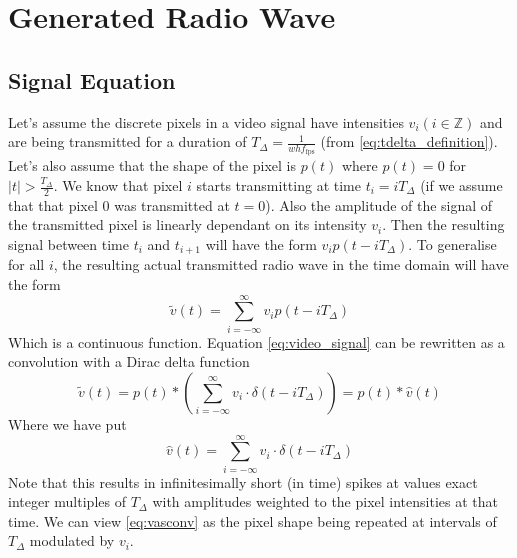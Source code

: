 \documentclass[a4paper,12pt,twoside,openright]{report}
\begin{document}
\section{Generated Radio Wave}

\subsection{Signal Equation}
Let's assume the discrete pixels in a video signal have intensities $v_{i} (i \in \mathbb{Z})$ and are being transmitted for a duration of $T_{\Delta}=\frac{1}{w h f_\text{fps}}$ (from \ref{eq:tdelta_definition}). Let's also assume that the shape of the pixel is $p(t)$ where $p(t)=0$ for $|t| > \frac{T_{\Delta}}{2}$. We know that pixel $i$ starts transmitting at time $t_{i}=i T_{\Delta}$ (if we assume that that pixel 0 was transmitted at $t=0$). Also the amplitude of the signal of the transmitted pixel is linearly dependant on its intensity $v_{i}$. Then the resulting signal between time $t_{i}$ and $t_{i+1}$ will have the form $v_{i} p(t-i T_{\Delta})$. To generalise for all $i$, the resulting actual transmitted radio wave in the time domain will have the form 
\begin{equation}
\label{eq:video_signal}
\tilde{v}(t) = \sum\limits_{i=-\infty}^{\infty} v_{i} p(t-i T_{\Delta})
\end{equation}
Which is a continuous function. Equation \ref{eq:video_signal} can be rewritten as a convolution with a Dirac delta function
\begin{equation}
\label{eq:vasconv}
\tilde{v}(t) = p(t) \ast \left( \sum\limits_{i=-\infty}^{\infty} v_{i} \cdot \delta(t-i T_{\Delta}) \right) = p(t) \ast \hat{v}(t)
\end{equation}
Where we have put
\begin{equation}
\label{eq:vhattdef}
\hat{v}(t) = \sum\limits_{i=-\infty}^{\infty} v_{i} \cdot \delta(t-i T_{\Delta})
\end{equation}
Note that this results in infinitesimally short (in time) spikes at values exact integer multiples of $T_{\Delta}$ with amplitudes weighted to the pixel intensities at that time. We can view \ref{eq:vasconv} as the pixel shape being repeated at intervals of $T_{\Delta}$ modulated by $v_{i}$. 
\end{document}

